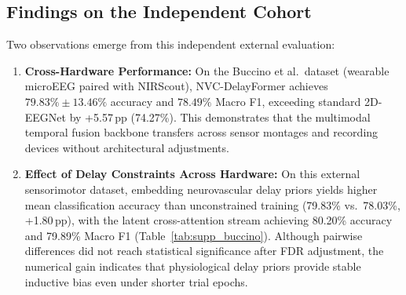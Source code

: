 \documentclass[journal]{IEEEtran}
\begin{document}
\subsection{Findings on the Independent Cohort}
Two observations emerge from this independent external evaluation:
\begin{enumerate}
    \item \textbf{Cross-Hardware Performance:} On the Buccino et al.\ dataset (wearable microEEG paired with NIRScout), NVC-DelayFormer achieves $79.83\% \pm 13.46\%$ accuracy and $78.49\%$ Macro F1, exceeding standard 2D-EEGNet by +5.57\,pp (74.27\%). This demonstrates that the multimodal temporal fusion backbone transfers across sensor montages and recording devices without architectural adjustments.
    \item \textbf{Effect of Delay Constraints Across Hardware:} On this external sensorimotor dataset, embedding neurovascular delay priors yields higher mean classification accuracy than unconstrained training (79.83\% vs.\ 78.03\%, +1.80\,pp), with the latent cross-attention stream achieving 80.20\% accuracy and 79.89\% Macro F1 (Table~\ref{tab:supp_buccino}). Although pairwise differences did not reach statistical significance after FDR adjustment, the numerical gain indicates that physiological delay priors provide stable inductive bias even under shorter trial epochs.
\end{enumerate}



\end{document}
